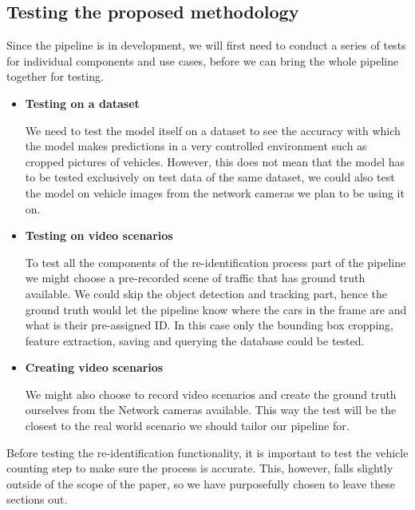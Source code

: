 \documentclass[conference]{IEEEtran} %
\begin{document}
				
		\subsection{Testing the proposed methodology}
			Since the pipeline is in development, we will first need to conduct a series of tests for individual components and use cases, before we can bring the whole pipeline together for testing.
			
		\begin{itemize}
			\item \textbf{Testing on a dataset}
			
			We need to test the model itself on a dataset to see the accuracy with which the model makes predictions in a very controlled environment such as cropped pictures of vehicles. However, this does not mean that the model has to be tested exclusively on test data of the same dataset, we could also test the model on vehicle images from the network cameras we plan to be using it on.
			
			\item \textbf{Testing on video scenarios}
			
			To test all the components of the re-identification process part of the pipeline we might choose a pre-recorded scene of traffic that has ground truth available. We could skip the object detection and tracking part, hence the ground truth would let the pipeline know where the cars in the frame are and what is their pre-assigned ID. In this case only the bounding box cropping, feature extraction, saving and querying the database could be tested.
			
			\item \textbf{Creating video scenarios}
			
			We might also choose to record video scenarios and create the ground truth ourselves from the Network cameras available. This way the test will be the closest to the real world scenario we should tailor our pipeline for.\newline
			
		\end{itemize}
		
		Before testing the re-identification functionality, it is important to test the vehicle counting step to make sure the process is accurate. This, however, falls slightly outside of the scope of the paper, so we have purposefully chosen to leave these sections out.
		
\end{document}
